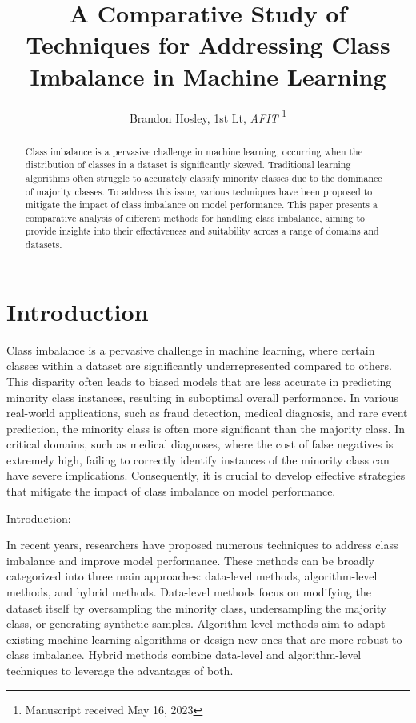 \documentclass[journal]{IEEEtran}
\title{A Comparative Study of Techniques for Addressing Class Imbalance in Machine Learning}
\author{Brandon Hosley, 1st Lt, \textit{AFIT}%
	\thanks{Manuscript received May 16, 2023%
	}}
\begin{document}
	
	\maketitle
	
	
	\begin{abstract}
		Class imbalance is a pervasive challenge in machine learning, occurring when the distribution of classes in a dataset is significantly skewed. Traditional learning algorithms often struggle to accurately classify minority classes due to the dominance of majority classes. To address this issue, various techniques have been proposed to mitigate the impact of class imbalance on model performance. This paper presents a comparative analysis of different methods for handling class imbalance, aiming to provide insights into their effectiveness and suitability across a range of domains and datasets.
	\end{abstract}
	
	\section{Introduction}
	\label{sec:introduction}
	Class imbalance is a pervasive challenge in machine learning, where certain classes within a dataset are significantly underrepresented compared to others. This disparity often leads to biased models that are less accurate in predicting minority class instances, resulting in suboptimal overall performance. In various real-world applications, such as fraud detection, medical diagnosis, and rare event prediction, the minority class is often more significant than the majority class. In critical domains, such as medical diagnoses, where the cost of false negatives is extremely high, failing to correctly identify instances of the minority class can have severe implications. Consequently, it is crucial to develop effective strategies that mitigate the impact of class imbalance on model performance.







Introduction:





In recent years, researchers have proposed numerous techniques to address class imbalance and improve model performance. These methods can be broadly categorized into three main approaches: data-level methods, algorithm-level methods, and hybrid methods. Data-level methods focus on modifying the dataset itself by oversampling the minority class, undersampling the majority class, or generating synthetic samples. Algorithm-level methods aim to adapt existing machine learning algorithms or design new ones that are more robust to class imbalance. Hybrid methods combine data-level and algorithm-level techniques to leverage the advantages of both.
\end{document}
